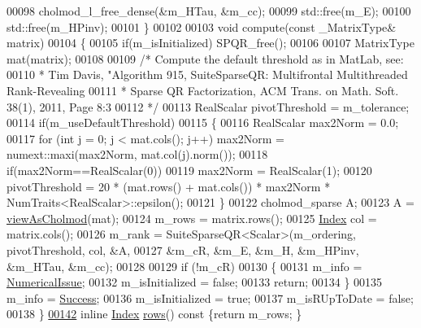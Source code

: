 \begin{DoxyCode}
00098       cholmod\_l\_free\_dense(&m\_HTau, &m\_cc);
00099       std::free(m\_E);
00100       std::free(m\_HPinv);
00101     \}
00102 
00103     \textcolor{keywordtype}{void} compute(\textcolor{keyword}{const} \_MatrixType& matrix)
00104     \{
00105       \textcolor{keywordflow}{if}(m\_isInitialized) SPQR\_free();
00106 
00107       MatrixType mat(matrix);
00108       
00109       \textcolor{comment}{/* Compute the default threshold as in MatLab, see:}
00110 \textcolor{comment}{       * Tim Davis, "Algorithm 915, SuiteSparseQR: Multifrontal Multithreaded Rank-Revealing}
00111 \textcolor{comment}{       * Sparse QR Factorization, ACM Trans. on Math. Soft. 38(1), 2011, Page 8:3 }
00112 \textcolor{comment}{       */}
00113       RealScalar pivotThreshold = m\_tolerance;
00114       \textcolor{keywordflow}{if}(m\_useDefaultThreshold) 
00115       \{
00116         RealScalar max2Norm = 0.0;
00117         \textcolor{keywordflow}{for} (\textcolor{keywordtype}{int} j = 0; j < mat.cols(); j++) max2Norm = numext::maxi(max2Norm, mat.col(j).norm());
00118         \textcolor{keywordflow}{if}(max2Norm==RealScalar(0))
00119           max2Norm = RealScalar(1);
00120         pivotThreshold = 20 * (mat.rows() + mat.cols()) * max2Norm * NumTraits<RealScalar>::epsilon();
00121       \}
00122       cholmod\_sparse A; 
00123       A = \hyperlink{namespace_eigen_ac9fb9e40cfc9ddbdc7da84ee01bb7545}{viewAsCholmod}(mat);
00124       m\_rows = matrix.rows();
00125       \hyperlink{namespace_eigen_a62e77e0933482dafde8fe197d9a2cfde}{Index} col = matrix.cols();
00126       m\_rank = SuiteSparseQR<Scalar>(m\_ordering, pivotThreshold, col, &A, 
00127                              &m\_cR, &m\_E, &m\_H, &m\_HPinv, &m\_HTau, &m\_cc);
00128 
00129       \textcolor{keywordflow}{if} (!m\_cR)
00130       \{
00131         m\_info = \hyperlink{group__enums_gga85fad7b87587764e5cf6b513a9e0ee5eaaf9b736d310a664e7729d163a035cc5f}{NumericalIssue};
00132         m\_isInitialized = \textcolor{keyword}{false};
00133         \textcolor{keywordflow}{return};
00134       \}
00135       m\_info = \hyperlink{group__enums_gga85fad7b87587764e5cf6b513a9e0ee5ea52581b035f4b59c203b8ff999ef5fcea}{Success};
00136       m\_isInitialized = \textcolor{keyword}{true};
00137       m\_isRUpToDate = \textcolor{keyword}{false};
00138     \}
\hyperlink{class_eigen_1_1_s_p_q_r_a775e28a44fd466638114edbcd17ea50a}{00142}     \textcolor{keyword}{inline} \hyperlink{namespace_eigen_a62e77e0933482dafde8fe197d9a2cfde}{Index} \hyperlink{class_eigen_1_1_s_p_q_r_a775e28a44fd466638114edbcd17ea50a}{rows}()\textcolor{keyword}{ const }\{\textcolor{keywordflow}{return} m\_rows; \}

\end{DoxyCode}

